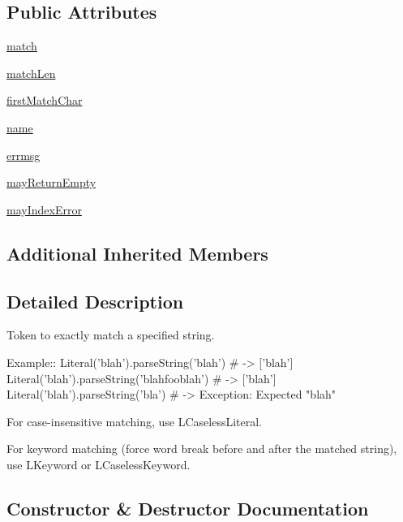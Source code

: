 \subsection*{Public Attributes}
\begin{DoxyCompactItemize}
\item 
\hyperlink{classpkg__resources_1_1__vendor_1_1pyparsing_1_1Literal_a83789374482c801753304343287fd8d4}{match}
\item 
\hyperlink{classpkg__resources_1_1__vendor_1_1pyparsing_1_1Literal_a3fde914473e208702a039e58081cf0be}{match\+Len}
\item 
\hyperlink{classpkg__resources_1_1__vendor_1_1pyparsing_1_1Literal_aec4f3f98aed13658904caa5c0a6c209f}{first\+Match\+Char}
\item 
\hyperlink{classpkg__resources_1_1__vendor_1_1pyparsing_1_1Literal_afa4486ddd889e03d88c49014e22fdde0}{name}
\item 
\hyperlink{classpkg__resources_1_1__vendor_1_1pyparsing_1_1Literal_a6169396e891b64d7ef283c239a612bb1}{errmsg}
\item 
\hyperlink{classpkg__resources_1_1__vendor_1_1pyparsing_1_1Literal_ab0af42a4a656bcb7f907087f5a5e6192}{may\+Return\+Empty}
\item 
\hyperlink{classpkg__resources_1_1__vendor_1_1pyparsing_1_1Literal_aea07276f0ad0b03b665b95021cd1ff06}{may\+Index\+Error}
\end{DoxyCompactItemize}
\subsection*{Additional Inherited Members}


\subsection{Detailed Description}
\begin{DoxyVerb}Token to exactly match a specified string.

Example::
    Literal('blah').parseString('blah')  # -> ['blah']
    Literal('blah').parseString('blahfooblah')  # -> ['blah']
    Literal('blah').parseString('bla')  # -> Exception: Expected "blah"

For case-insensitive matching, use L{CaselessLiteral}.

For keyword matching (force word break before and after the matched string),
use L{Keyword} or L{CaselessKeyword}.
\end{DoxyVerb}
 

\subsection{Constructor \& Destructor Documentation}
\mbox{\label{classpkg__resources_1_1__vendor_1_1pyparsing_1_1Literal_a84998933148a451f733fc5c60058f6ad}} 

